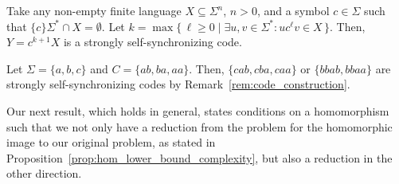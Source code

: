 \begin{remark}[Construction] %
\label{rem:code_construction}
 Take any non-empty finite language $X \subseteq \Sigma^n$, $n > 0$,
 and a symbol $c \in \Sigma$ such that $\{c\}\Sigma^* \cap X = \emptyset$.
 Let $k=\max\{\,\ell\geq0\mid \exists u,v\in\Sigma^*:uc^\ell v\in X\,\}$.
 Then, $Y = c^{k+1}X$
 is a strongly self-synchronizing code.
\end{remark}

\begin{example}\label{ex:strongly_self_sync_construction}
Let $\Sigma = \{a,b,c\}$
and $C = \{ ab,ba, aa\}$.
Then, $\{ cab, cba, caa \}$ or $\{ bbab, bbaa \}$
are strongly self-synchronizing codes by Remark~\ref{rem:code_construction}.
\end{example}




Our next result, which holds in general, states conditions on a homomorphism
such that we not only have a reduction from the problem
for the homomorphic image to our original problem, as stated in Proposition~\ref{prop:hom_lower_bound_complexity},
but also a reduction in the other direction.

